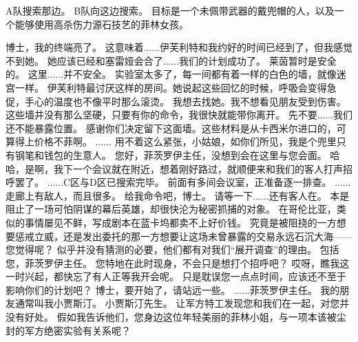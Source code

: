 \documentclass[openany]{book}
\begin{document}
\begin{dialogue}
     A队搜索那边。
     B队向这边搜索。
     目标是一个未佩带武器的戴兜帽的人，以及一个能够使用高杀伤力源石技艺的菲林女孩。
\end{dialogue}

\begin{dialogue}
     博士，我的终端亮了。
     这意味着......伊芙利特和我约好的时间已经到了，但我感觉不到她。
     她应该已经和塞雷娅会合了......我们的计划成功了。
     莱茵暂时是安全的。
     这里......并不安全。
     实验室太多了，每一间都有着一样的白色的墙，就像迷宫一样。
     伊芙利特最讨厌这样的房间。她说起这些回忆的时候，呼吸会变得急促，手心的温度也不像平时那么滚烫。
     我想去找她。我不想看见朋友受到伤害。
     这些墙并没有那么坚硬，只要有你的命令，我很快就能带你离开。
     先不要......我们还不能暴露位置。
     感谢你们决定留下这面墙。这些材料是从卡西米尔进口的，可算得上价格不菲啊。
     ......
     用不着这么紧张，小姑娘，如你们所见，我是个兜里只有钢笔和钱包的生意人。
     您好，菲茨罗伊主任，没想到会在这里与您会面。
     哈哈，是啊，我下一个会议就在附近，想着刚好路过，就顺便来和我们的客人打声招呼罢了。
     ......C区与D区已搜索完毕。
     前面有多间会议室，正准备逐一排查。
     ......走廊上有敌人，而且很多。
     给我命令吧，博士。
     请等一下......还有客人在。
     本是阻止了一场可怕阴谋的幕后英雄，却很快沦为秘密抓捕的对象。
     在哥伦比亚，类似的事情屡见不鲜，写成剧本在蓝卡坞都卖不上好价钱。
     究竟是被阻挠的一方想要惩戒立威，还是发出委托的那一方想要让这场未曾暴露的交易永远石沉大海——
     您觉得呢？
     似乎并没有猜测的必要，他们都有对我们“展开调查”的理由。
     包括您，菲茨罗伊主任。
     您特地在此时现身，不会只是想打个招呼吧？
     哎呀，瞧我这一时兴起，都快忘了有人正等我开会呢。
     只是耽误您一点点时间，应该还不至于影响你们的计划吧？
     博士，要开始了，请站远一些。
     ......菲茨罗伊主任。
     我的朋友通常叫我小贾斯汀。
     小贾斯汀先生。
     让军方特工发现您和我们在一起，对您并没有好处。
     假如我告诉他们，您身边这位年轻美丽的菲林小姐，与一项本该被尘封的军方绝密实验有关系呢？

\end{dialogue}
\end{document}
